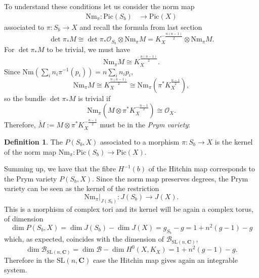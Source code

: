 \documentclass[12pt,a4paper]{book}
\theoremstyle{definition} \newtheorem{defn}[thm]{Definition}
\theoremstyle{definition} \newtheorem{ejemplo}[thm]{Example}
\theoremstyle{remark} \newtheorem{rem}[thm]{Remark}
\def\OO{\mathscr{O}}
\def\BB{\mathscr{B}}
\def\CC{\mathbf{C}}
\def\Nm{\mathrm{Nm}}
\def\SL{\mathrm{SL}}
\def\Pic{\mathrm{Pic}}
\let\emph\relax
\begin{document}
To understand these conditions let us consider the norm map
  \begin{align*}
     \Nm_\pi: \Pic(S_b)&\longrightarrow \Pic(X)
    \end{align*}
    associated to $\pi:S_b\rightarrow X$ and recall the formula from last section
    \begin{equation*}
      \det \pi_*M \cong \det \pi_*\OO_{S_b} \otimes \Nm_\pi M=K_X^{-\frac{n(n-1)}{2}} \otimes \Nm_\pi M.
    \end{equation*}
    For $\det \pi_*M$ to be trivial, we must have
    \begin{equation*}
      \Nm_\pi M \cong K_X^{\frac{n(n-1)}{2}}.
    \end{equation*}
    Since $\Nm(\sum_i n_i\pi^{-1}(p_i))=n\sum_i n_ip_i$, 
    \begin{equation*}
      \Nm_\pi M \cong K_X^{\frac{n(n-1)}{2}} \cong \Nm_\pi\left(\pi^*K_X^{\frac{n-1}{2}}\right),
    \end{equation*}
    so the bundle $\det \pi_*M$ is trivial if
    \begin{equation*}
      \Nm_\pi \left(M\otimes \pi^*K_X^{-\frac{n-1}{2}}\right) \cong \OO_X.
    \end{equation*}
    Therefore, $\widetilde{M}:=M\otimes \pi^*K_X^{-\frac{n-1}{2}}$ must be in the \textit{Prym variety}:
    \begin{defn}
      The \emph{Prym variety} $P(S_b,X)$ associated to a morphism $\pi:S_b \rightarrow X$ is the kernel of the norm map $\Nm_\pi:\Pic(S_b) \rightarrow \Pic(X)$.
    \end{defn}
    Summing up, we have that the fibre $H^{-1}(b)$ of the Hitchin map corresponds to the Prym variety $P(S_b,X)$. Since the norm map preserves degrees, the Prym variety can be seen as the kernel of the restriction
    \begin{equation*}
      \Nm_\pi |_{J(S_b)}: J(S_b) \longrightarrow J(X).
    \end{equation*}
    This is a morphism of complex tori and its kernel will be again a complex torus, of dimension
    \begin{equation*}
      \dim P(S_b,X)= \dim J(S_b) - \dim J(X)= g_{S_b} - g = 1+n^2(g-1) -g
    \end{equation*}
    which, as expected, coincides with the dimension of $\BB_{\SL(n,\CC)}$,
    \begin{equation*}
      \dim \BB_{\SL(n,\CC)}= \dim \BB - \dim H^0(X,K_X)= 1+n^2(g-1)-g.
    \end{equation*}
    Therefore in the $\SL(n,\CC)$ case the Hitchin map gives again an integrable system.
\end{document}
